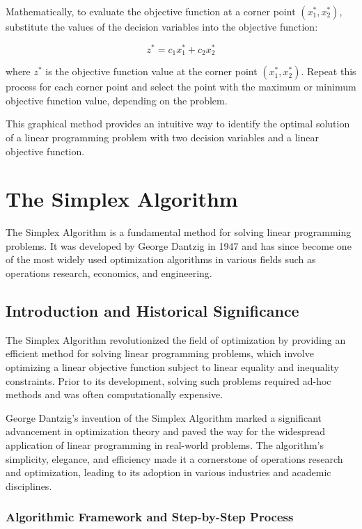 \documentclass[12pt]{book} %
\begin{document}
Mathematically, to evaluate the objective function at a corner point \( (x_1^*, x_2^*) \), substitute the values of the decision variables into the objective function:

\[
z^* = c_1 x_1^* + c_2 x_2^*
\]

where \( z^* \) is the objective function value at the corner point \( (x_1^*, x_2^*) \). Repeat this process for each corner point and select the point with the maximum or minimum objective function value, depending on the problem.

This graphical method provides an intuitive way to identify the optimal solution of a linear programming problem with two decision variables and a linear objective function.


\section{The Simplex Algorithm}

The Simplex Algorithm is a fundamental method for solving linear programming problems. It was developed by George Dantzig in 1947 and has since become one of the most widely used optimization algorithms in various fields such as operations research, economics, and engineering.

\subsection{Introduction and Historical Significance}

The Simplex Algorithm revolutionized the field of optimization by providing an efficient method for solving linear programming problems, which involve optimizing a linear objective function subject to linear equality and inequality constraints. Prior to its development, solving such problems required ad-hoc methods and was often computationally expensive.

George Dantzig's invention of the Simplex Algorithm marked a significant advancement in optimization theory and paved the way for the widespread application of linear programming in real-world problems. The algorithm's simplicity, elegance, and efficiency made it a cornerstone of operations research and optimization, leading to its adoption in various industries and academic disciplines.

\subsubsection{Algorithmic Framework and Step-by-Step Process}
\end{document}
